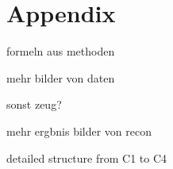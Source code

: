 \chapter{Appendix}
\label{sec:appendix}
formeln aus methoden

mehr bilder von daten

sonst zeug?

mehr ergbnis bilder von recon

detailed structure from C1 to C4